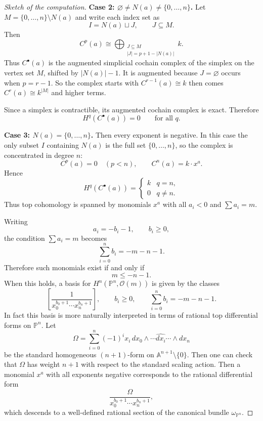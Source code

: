 \documentclass[12pt]{article}
\begin{document}
\begin{proof}[Sketch of the computation]
    \noindent\textbf{Case 2: $\varnothing\neq N(a)\neq \{0,\dots,n\}$.}
    Let $M=\{0,\dots,n\}\setminus N(a)$ and write each index set as
    \[
        I=N(a)\sqcup J, \qquad J\subseteq M.
    \]
    Then
    \[
        C^p(a)\cong \bigoplus_{\substack{J\subseteq M\\ |J|=p+1-|N(a)|}} k.
    \]
    Thus $C^\bullet(a)$ is the augmented simplicial cochain complex of the simplex on the vertex set $M$, shifted by $|N(a)|-1$. It is augmented because $J=\varnothing$ occurs when
    $p=r-1$.
    So the complex starts with
    $C^{r-1}(a)\cong k$ then comes $C^r(a)\cong k^{|M|}$ and higher terms.


    Since a simplex is contractible, its augmented cochain complex is exact. Therefore
    \[
        H^q(C^\bullet(a))=0
        \qquad \text{for all } q.
    \]

    \noindent\textbf{Case 3: \(N(a)=\{0,\dots,n\}\).}
    Then every exponent is negative. In this case the only subset \(I\) containing \(N(a)\) is the full set \(\{0,\dots,n\}\), so the complex is concentrated in degree \(n\):
    \[
        C^p(a)=0 \quad (p<n),
        \qquad
        C^n(a)=k\cdot x^a.
    \]
    Hence
    \[
        H^q(C^\bullet(a))=
        \begin{cases}
            k & q=n,    \\
            0 & q\ne n.
        \end{cases}
    \]
    Thus top cohomology is spanned by monomials \(x^a\) with all \(a_i<0\) and \(\sum a_i=m\).

    Writing
    \[
        a_i=-b_i-1, \qquad b_i\ge 0,
    \]
    the condition \(\sum a_i=m\) becomes
    \[
        \sum_{i=0}^n b_i=-m-n-1.
    \]
    Therefore such monomials exist if and only if
    \[
        m\le -n-1.
    \]
    When this holds, a basis for \(H^n(\mathbb P^n,\mathcal O(m))\) is given by the classes
    \[
        \left[\frac{1}{x_0^{b_0+1}\cdots x_n^{b_n+1}}\right],
        \qquad b_i\ge 0, \qquad \sum_{i=0}^n b_i=-m-n-1.
    \]
    In fact this basis is more naturally interpreted in terms of rational top differential forms on \(\mathbb P^n\). Let
    \[
        \Omega = \sum_{i=0}^n (-1)^i x_i\, dx_0 \wedge \cdots \widehat{dx_i} \cdots \wedge dx_n
    \]
    be the standard homogeneous \((n+1)\)-form on \(\mathbb A^{n+1}\setminus\{0\}\). Then one can check that $\Omega$ has weight $n+1$ with respect to the standard scaling action. Then a monomial \(x^a\) with all exponents negative corresponds to the rational differential form
    \[
        \frac{\Omega}{x_0^{b_0+1}\cdots x_n^{b_n+1}},
    \]
    which descends to a well-defined rational section of the canonical bundle \(\omega_{\mathbb P^n}\).
\end{proof}
\end{document}
